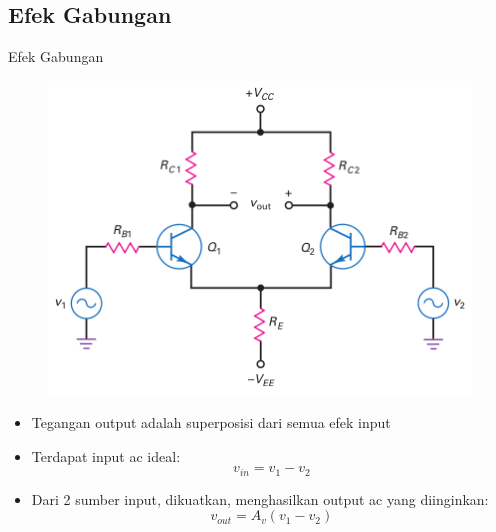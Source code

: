 \documentclass[aspectratio=169]{beamer}
\begin{document}
\subsection{Efek Gabungan}
\begin{frame}{Efek Gabungan}
	\begin{multicols}{2}
		\begin{figure}
			\centering
			\includegraphics[height=0.6\textheight]{gambar/01.diff-amp/01.output_of_diff_amp_includes_desired_signal_and_error_voltage}
		\end{figure}
		\columnbreak
		\begin{itemize}
			\item Tegangan output adalah superposisi dari semua efek input
			\item Terdapat input ac ideal: $$ v_{in} = v_1 - v_2 $$
			\item Dari 2 sumber input, dikuatkan, menghasilkan output ac yang diinginkan: $$ v_{out} = A_v(v_1 - v_2) $$
		\end{itemize}
	\end{multicols}
\end{frame}
\end{document}
